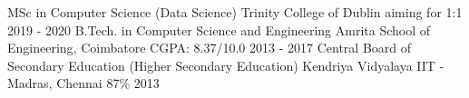 \begin{cventries}
  \cventry
    {MSc in Computer Science (Data Science)}
    {Trinity College of Dublin}
    {aiming for 1:1}
    {2019 - 2020}
    {\empty}
  \cventry
    {B.Tech. in Computer Science and Engineering}
    {Amrita School of Engineering, Coimbatore}
    {CGPA: 8.37/10.0}
    {2013 - 2017}
    {\empty}
  \cventry
    {Central Board of Secondary Education (Higher Secondary Education)}
    {Kendriya Vidyalaya IIT - Madras, Chennai}
    {87\%}
    {2013}
    {\empty}
\end{cventries}
